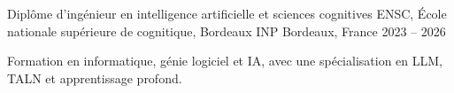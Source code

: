 
\begin{cventries}
  \cventry
    {Diplôme d’ingénieur en intelligence artificielle et sciences cognitives}
    {ENSC, École nationale supérieure de cognitique, Bordeaux INP}
    {Bordeaux, France}
    {2023 -- 2026}
    {
      \begin{cvitems}
        \item {Formation en informatique, génie logiciel et IA, avec une spécialisation en LLM, TALN et apprentissage profond.}
      \end{cvitems}
    }
\end{cventries}
